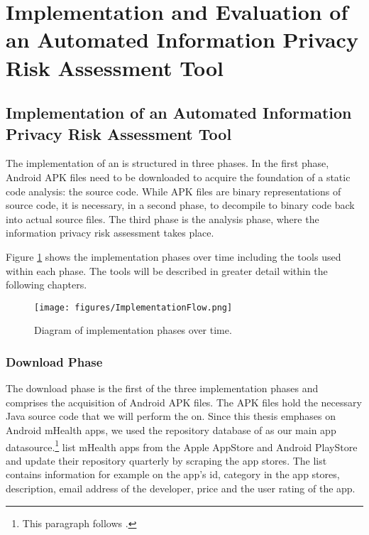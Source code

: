 \section{Implementation and Evaluation of an Automated Information Privacy Risk Assessment Tool}

\subsection{Implementation of an Automated Information Privacy Risk Assessment Tool}

The implementation of an \aiprat is structured in three phases.
In the first phase, Android APK files need to be downloaded to acquire the foundation of a static code analysis: the source code.
While APK files are binary representations of source code, it is necessary, in a second phase, to decompile to binary code back into actual source files.
The third phase is the analysis phase, where the information privacy risk assessment takes place.

Figure \ref{fig:implementationPhases} shows the implementation phases over time including the tools used within each phase. 
The tools will be described in greater detail within the following chapters.

\begin{figure}[h]
	\caption{Diagram of implementation phases over time.}
	\centering
	\texttt{[image: figures/ImplementationFlow.png]}
	\label{fig:implementationPhases}
\end{figure}

\subsubsection{Download Phase}

The download phase is the first of the three implementation phases and comprises the acquisition of Android APK files. 
The APK files hold the necessary Java source code that we will perform the \sca on.
Since this thesis emphases on Android mHealth apps, we used the repository database of \cite{Xu2015} as our main app datasource.\footnote{This paragraph follows \cite{Xu2015}.}
\cite{Xu2015} list mHealth apps from the Apple AppStore and Android PlayStore and update their repository quarterly by scraping the app stores.
The list contains information for example on the app's id, category in the app stores, description, email address of the developer, price and the user rating of the app.

